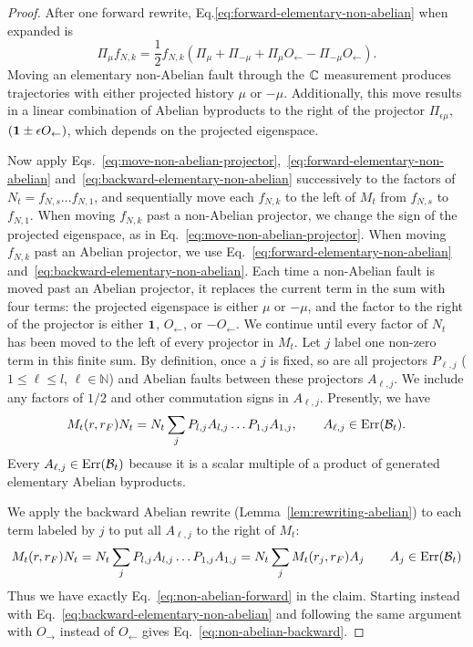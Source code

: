 \documentclass[11pt]{article}
\begin{document}
\begin{proof}
    After one forward rewrite, Eq.\eqref{eq:forward-elementary-non-abelian} when expanded is
    \[
    \Pi_\mu f_{N,k} = \frac{1}{2}f_{N,k} (\Pi_\mu + \Pi_{-\mu} + \Pi_\mu O_\leftarrow - \Pi_{-\mu} O_\leftarrow).
    \]
    Moving an elementary non-Abelian fault through the $\mathbb{C}_{}$ measurement produces trajectories with either projected history $\mu$ or $-\mu$. Additionally, this move results in a linear combination of Abelian byproducts to the right of the projector $\Pi_{\epsilon \mu}$, $(\mathbf{1}\pm \epsilon O_\leftarrow)$, which depends on the projected eigenspace.

    Now apply Eqs.~\eqref{eq:move-non-abelian-projector},~\eqref{eq:forward-elementary-non-abelian} and~\eqref{eq:backward-elementary-non-abelian} successively to the factors of $N_t = f_{N,s}\dots f_{N,1}$, and sequentially move each $f_{N,k}$ to the left of $M_t$ from $f_{N,s}$ to $f_{N,1}$.
    When moving $f_{N,k}$ past a non-Abelian projector, we change the sign of the projected eigenspace, as in Eq.~\eqref{eq:move-non-abelian-projector}. When moving $f_{N,k}$ past an Abelian projector, we use Eq.~\eqref{eq:forward-elementary-non-abelian} and~\eqref{eq:backward-elementary-non-abelian}.
    Each time a non-Abelian fault is moved past an Abelian projector, it replaces the current term in the sum with four terms: the projected eigenspace is either $\mu$ or $-\mu$, and the factor to the right of the projector is either $\mathbf{1}$, $O_\leftarrow$, or $-O_\leftarrow$. 
    We continue until every factor of $N_t$ has been moved to the left of every projector in $M_t$. Let $j$ label one non-zero term in this finite sum. By definition, once a $j$ is fixed, so are all projectors $P_{\ell,j}$ ($1\le \ell \le l$, $\ell\in \mathbb{N}$) and Abelian faults between these projectors $A_{\ell,j}$. We include any factors of $1/2$ and other commutation signs in $A_{\ell,j}$.
    Presently, we have
    \[
    M_t(r,r_F)N_t = N_t \sum_{j} P_{l,j}  A_{l,j}\dots P_{1,j}A_{1,j},\qquad A_{\ell,j}\in \mathrm{Err}(\mathcal{B}_t).
    \]
    Every $A_{\ell,j}\in \mathrm{Err}(\mathcal{B}_t)$ because it is a scalar multiple of a product of generated elementary Abelian byproducts.

    We apply the backward Abelian rewrite (Lemma~\ref{lem:rewriting-abelian}) to each term labeled by $j$ to put all $A_{\ell,j}$ to the right of $M_t$:
    \[
    M_t(r,r_F)N_t = N_t \sum_{j} P_{l,j}  A_{l,j}\dots P_{1,j}A_{1,j}= 
    N_t\sum_j M_t(r_j,r_F)A_j
    \qquad A_j\in \mathrm{Err}(\mathcal{B}_t) 
    \]
    Thus we have exactly Eq.~\eqref{eq:non-abelian-forward} in the claim. Starting instead with Eq.~\eqref{eq:backward-elementary-non-abelian} and following the same argument with $O_\rightarrow$ instead of $O_\leftarrow$ gives Eq.~\eqref{eq:non-abelian-backward}.
\end{proof}
\end{document}
